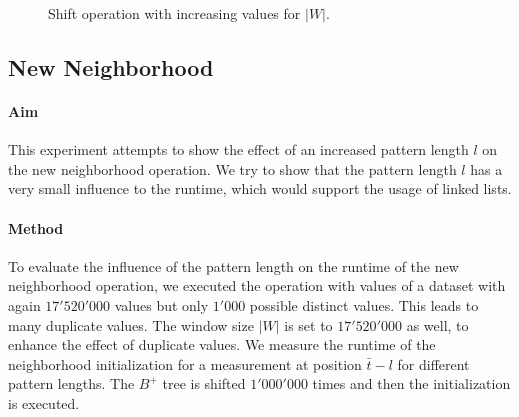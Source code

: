 \documentclass[abstracton,12pt,oneside]{scrreprt}
\begin{document}
\begin{figure}[H]
	\centering
{}
	\caption{Shift operation with increasing values for $|W|$.} \label{fig:window}
\end{figure}


\subsection{New Neighborhood}


\paragraph{Aim}

This experiment attempts to show the effect of an increased pattern length $l$ on the new neighborhood operation. We try to show that the pattern length $l$ has a very small influence to the runtime, which would support the usage of linked lists. 

\paragraph{Method}
To evaluate the influence of the pattern length on the runtime of the new neighborhood operation, we executed the operation with values of a dataset with again $17'520'000$ values but only $1'000$ possible distinct values. This leads to many duplicate values.  The window size $|W|$ is set to $17'520'000$ as well, to enhance the effect of duplicate values.
We measure the runtime of the neighborhood initialization for a measurement at position $\bar{t}-l$ for different pattern lengths. The $B^+$ tree is shifted $1'000'000$ times and then the initialization is executed. 
\end{document}
